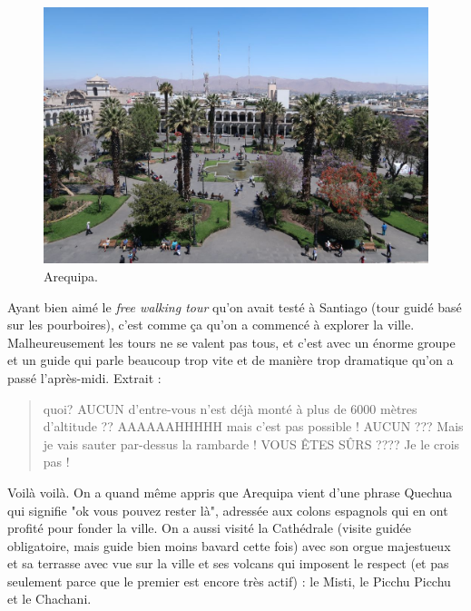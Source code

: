 \begin{figure}
\centering
\includegraphics{images/20180911_arequipa.JPG}
\caption{Arequipa.}
\end{figure}

Ayant bien aimé le \emph{free walking tour} qu'on avait testé à Santiago
(tour guidé basé sur les pourboires), c'est comme ça qu'on a commencé à
explorer la ville. Malheureusement les tours ne se valent pas tous, et
c'est avec un énorme groupe et un guide qui parle beaucoup trop vite et
de manière trop dramatique qu'on a passé l'après-midi. Extrait :

\begin{quote}
quoi? AUCUN d'entre-vous n'est déjà monté à plus de 6000 mètres
d'altitude ?? AAAAAAHHHHH mais c'est pas possible ! AUCUN ??? Mais je
vais sauter par-dessus la rambarde ! VOUS ÊTES SÛRS ???? Je le crois pas
!
\end{quote}

Voilà voilà. On a quand même appris que Arequipa vient d'une phrase
Quechua qui signifie "ok vous pouvez rester là", adressée aux colons
espagnols qui en ont profité pour fonder la ville. On a aussi visité la
Cathédrale (visite guidée obligatoire, mais guide bien moins bavard
cette fois) avec son orgue majestueux et sa terrasse avec vue sur la
ville et ses volcans qui imposent le respect (et pas seulement parce que
le premier est encore très actif) : le Misti, le Picchu Picchu et le
Chachani.

